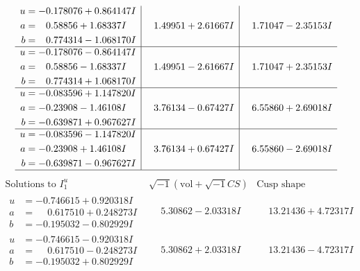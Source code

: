 \documentclass[1p]{elsarticle_modified}
\theoremstyle{definition}
\newcommand{\I}{\sqrt{-1}}
\begin{document}
$$\begin{array}{c|c|c}
\begin{aligned}
u &= -0.178076 + 0.864147 I \\
a &= \phantom{-}0.58856 + 1.68337 I \\
b &= \phantom{-}0.774314 - 1.068170 I\end{aligned}
 & \phantom{-}1.49951 + 2.61667 I & \phantom{-}1.71047 - 2.35153 I \\ \hline\begin{aligned}
u &= -0.178076 - 0.864147 I \\
a &= \phantom{-}0.58856 - 1.68337 I \\
b &= \phantom{-}0.774314 + 1.068170 I\end{aligned}
 & \phantom{-}1.49951 - 2.61667 I & \phantom{-}1.71047 + 2.35153 I \\ \hline\begin{aligned}
u &= -0.083596 + 1.147820 I \\
a &= -0.23908 - 1.46108 I \\
b &= -0.639871 + 0.967627 I\end{aligned}
 & \phantom{-}3.76134 - 0.67427 I & \phantom{-}6.55860 + 2.69018 I \\ \hline\begin{aligned}
u &= -0.083596 - 1.147820 I \\
a &= -0.23908 + 1.46108 I \\
b &= -0.639871 - 0.967627 I\end{aligned}
 & \phantom{-}3.76134 + 0.67427 I & \phantom{-}6.55860 - 2.69018 I\\
 \hline 
 \end{array}$$\newpage$$\begin{array}{c|c|c}  
\text{Solutions to }I^u_{1}& \I (\text{vol} + \sqrt{-1}CS) & \text{Cusp shape}\\
 \hline 
\begin{aligned}
u &= -0.746615 + 0.920318 I \\
a &= \phantom{-}0.617510 + 0.248273 I \\
b &= -0.195032 - 0.802929 I\end{aligned}
 & \phantom{-}5.30862 - 2.03318 I & \phantom{-}13.21436 + 4.72317 I \\ \hline\begin{aligned}
u &= -0.746615 - 0.920318 I \\
a &= \phantom{-}0.617510 - 0.248273 I \\
b &= -0.195032 + 0.802929 I\end{aligned}
 & \phantom{-}5.30862 + 2.03318 I & \phantom{-}13.21436 - 4.72317 I \\ \hline\begin{aligned}

\end{aligned}
\end{array}$$
\end{document}
